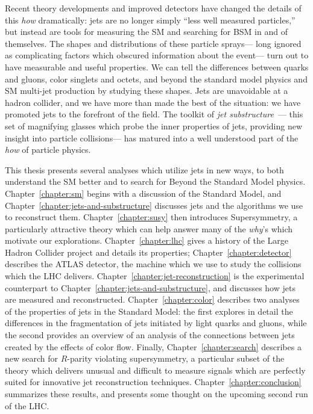 Recent theory developments and improved detectors have changed the details of this \textit{how} dramatically: jets are no longer simply ``less well measured particles,'' but instead are tools for measuring the SM and searching for BSM in and of themselves. The shapes and distributions of these particle sprays--- long ignored as complicating factors which obscured information about the event--- turn out to have measurable and useful properties. We can tell the differences between quarks and gluons, color singlets and octets, and beyond the standard model physics and SM multi-jet production by studying these shapes. Jets are unavoidable at a hadron collider, and we have more than made the best of the situation: we have promoted jets to the forefront of the field. The toolkit of \textit{jet substructure}~\cite{Abdesselam:2010pt,Altheimer:2012mn,Altheimer:2013yza,Adams:2015hiv}--- this set of magnifying glasses which probe the inner properties of jets, providing new insight into particle collisions--- has matured into a well understood part of the \textit{how} of particle physics.



This thesis presents several analyses which utilize jets in new ways, to both understand the SM better and to search for Beyond the Standard Model physics.  Chapter~\ref{chapter:sm} begins with a discussion of the Standard Model, and Chapter~\ref{chapter:jets-and-substructure} discusses jets and the algorithms we use to reconstruct them. Chapter~\ref{chapter:susy} then introduces Supersymmetry, a particularly attractive theory which can help answer many of the \textit{why}'s which motivate our explorations. Chapter~\ref{chapter:lhc} gives a history of the Large Hadron Collider project and details its properties; Chapter~\ref{chapter:detector} describes the ATLAS detector, the machine which we use to study the collisions which the LHC delivers. Chapter~\ref{chapter:jet-reconstruction} is the experimental counterpart to Chapter~\ref{chapter:jets-and-substructure}, and discusses how jets are measured and reconstructed. Chapter~\ref{chapter:color} describes two analyses of the properties of jets in the Standard Model: the first explores in detail the differences in the fragmentation of jets initiated by light quarks and gluons, while the second provides an overview of an analysis of the connections between jets created by the effects of color flow. Finally, Chapter~\ref{chapter:search} describes a new search for $R$-parity violating supersymmetry, a particular subset of the theory which delivers unusual and difficult to measure signals which are perfectly suited for innovative jet reconstruction techniques. Chapter~\ref{chapter:conclusion} summarizes these results, and presents some thought on the upcoming second run of the LHC.

